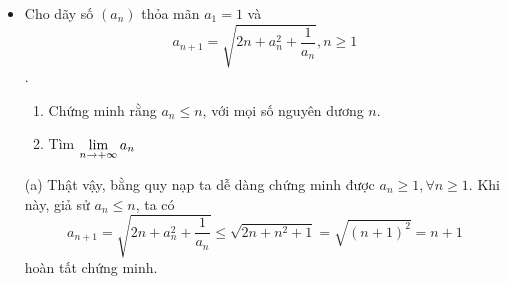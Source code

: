 \documentclass[11pt]{scrartcl}
\begin{document}
\setcounter{page}{1}
\thispagestyle{plain}
\begin{itemize}[label=, leftmargin=0em, itemsep=0.5em]
    
    \section{\huge Dãy số}
    \subsection{\LARGE \textcolor{dk}{Đề bài}}
    
    \item \begin{bt}
        Cho dãy số $(a_n)$ thỏa mãn $a_1 = 1$ và $$a_{n + 1} = \sqrt{2n + a_n^2 + \frac{1}{a_n}}, n \geq 1$$.
        \begin{enumerate}[label=(\alph*)]
            \item Chứng minh rằng $a_n \leq n$, với mọi số nguyên dương $n$.
            \item Tìm $\displaystyle\lim_{n \to +\infty} a_n$
        \end{enumerate}
    \end{bt}
    \begin{sol}
        (a) Thật vậy, bằng quy nạp ta dễ dàng chứng minh được $a_n \geq 1, \forall n \geq 1$. Khi này, giả sử $a_{n} \leq n$, ta có 
        \[
            a_{n + 1} = \sqrt{2n + a_n^2 + \frac{1}{a_n}} \leq \sqrt{2n + n^2 + 1 } = \sqrt{(n + 1)^2} = n + 1
        \]
        hoàn tất chứng minh.


\end{sol}
\end{itemize}
\end{document}
